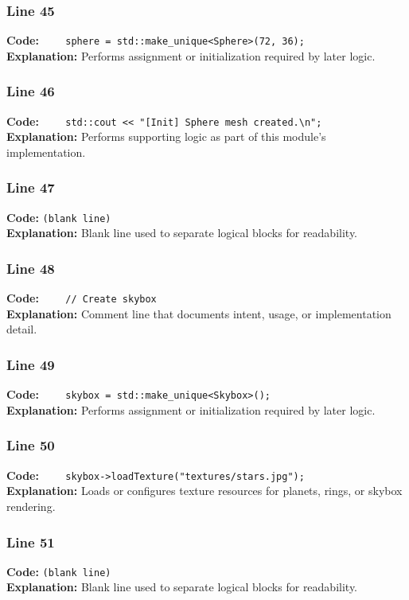 \documentclass[11pt,a4paper]{article}
\begin{document}
\subsubsection*{Line 45}
\textbf{Code:} \verb|    sphere = std::make_unique<Sphere>(72, 36);|\\
\textbf{Explanation:} Performs assignment or initialization required by later logic.

\subsubsection*{Line 46}
\textbf{Code:} \verb|    std::cout << "[Init] Sphere mesh created.\n";|\\
\textbf{Explanation:} Performs supporting logic as part of this module's implementation.

\subsubsection*{Line 47}
\textbf{Code:} \texttt{(blank line)}\\
\textbf{Explanation:} Blank line used to separate logical blocks for readability.

\subsubsection*{Line 48}
\textbf{Code:} \verb|    // Create skybox|\\
\textbf{Explanation:} Comment line that documents intent, usage, or implementation detail.

\subsubsection*{Line 49}
\textbf{Code:} \verb|    skybox = std::make_unique<Skybox>();|\\
\textbf{Explanation:} Performs assignment or initialization required by later logic.

\subsubsection*{Line 50}
\textbf{Code:} \verb|    skybox->loadTexture("textures/stars.jpg");|\\
\textbf{Explanation:} Loads or configures texture resources for planets, rings, or skybox rendering.

\subsubsection*{Line 51}
\textbf{Code:} \texttt{(blank line)}\\
\textbf{Explanation:} Blank line used to separate logical blocks for readability.
\end{document}
